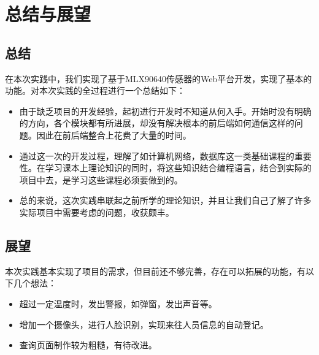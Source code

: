 \chapter{总结与展望}
\section{总结}
在本次实践中，我们实现了基于MLX90640传感器的Web平台开发，实现了基本的功能。对本次实践的全过程进行一个总结如下：
\begin{itemize}
    \item 由于缺乏项目的开发经验，起初进行开发时不知道从何入手。开始时没有明确的方向，各个模块都有所进展，却没有解决根本的前后端如何通信这样的问题。因此在前后端整合上花费了大量的时间。
    \item 通过这一次的开发过程，理解了如计算机网络，数据库这一类基础课程的重要性。在学习课本上理论知识的同时，将这些知识结合编程语言，结合到实际的项目中去，是学习这些课程必须要做到的。
    \item 总的来说，这次实践串联起之前所学的理论知识，并且让我们自己了解了许多实际项目中需要考虑的问题，收获颇丰。
    \end{itemize}
\section{展望}
本次实践基本实现了项目的需求，但目前还不够完善，存在可以拓展的功能，有以下几个想法：
\begin{itemize}
    \item 超过一定温度时，发出警报，如弹窗，发出声音等。
    \item 增加一个摄像头，进行人脸识别，实现来往人员信息的自动登记。
    \item 查询页面制作较为粗糙，有待改进。
    \end{itemize}